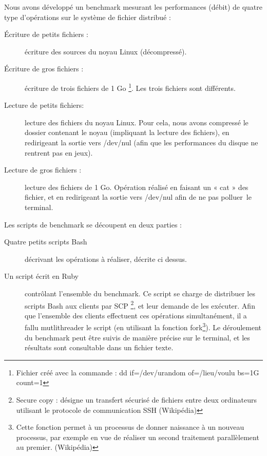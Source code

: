\documentclass[12pt]{report}
\begin{document}
			Nous avons développé un benchmark mesurant les performances (débit) de quatre type d'opérations sur le système de fichier distribué :
			\begin{description}
				\item[Écriture de petits fichiers :] écriture des sources du noyau Linux (décompressé).
				\item[Écriture de gros fichiers :] écriture de trois fichiers de 1 Go
				\footnote{Fichier créé avec la commande : dd if=/dev/urandom of=/lieu/voulu bs=1G count=1}. Les trois fichiers sont différents.
				\item[Lecture de petits fichiers: ] lecture des fichiers du noyau Linux.
				Pour cela, nous avons compressé le dossier contenant le noyau (impliquant la lecture des fichiers),
				en redirigeant la sortie vers /dev/nul (afin que les performances du disque ne rentrent pas en jeux).
				\item[Lecture de gros fichiers :] lecture des fichiers de 1 Go. Opération réalisé en faisant un « cat » des fichier,
				et en redirigeant la sortie vers /dev/nul afin de ne pas \og polluer\fg~le terminal.\\
			\end{description}

			Les scripts de benchmark se découpent en deux parties :
			\begin{description}
				\item[Quatre petits scripts Bash]décrivant les opérations à réaliser, décrite ci dessus.
				\item[Un script écrit en Ruby] contrôlant l'ensemble du benchmark.
				Ce script se charge de distribuer les scripts Bash aux clients par SCP
				\footnote{Secure copy : désigne un transfert sécurisé de fichiers entre deux ordinateurs utilisant le protocole de communication SSH (Wikipédia)},
				et leur demande de les exécuter. Afin que l'ensemble des clients effectuent ces opérations simultanément, il a fallu mutlithreader le script
				(en utilisant la fonction fork\footnote{Cette fonction permet à un processus de donner naissance à un nouveau processus,
				par exemple en vue de réaliser un second traitement parallèlement au premier. (Wikipédia)}).
				Le déroulement du benchmark peut être suivis de manière précise sur le terminal, et les résultats sont consultable dans un fichier texte.
			\end{description}
\end{document}

